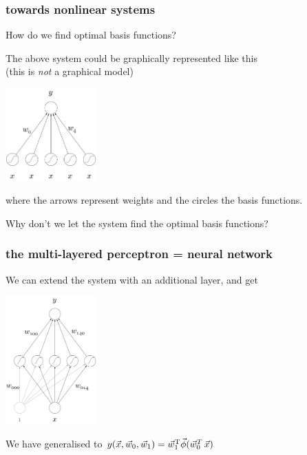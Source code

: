 \documentclass[USenglish,pdftex,compress,10pt,svgnamesi,handout]{beamer}
\begin{document}
\begin{frame}
\frametitle{towards nonlinear systems}
How do we find optimal basis functions?

\pause
The above system could be graphically represented like this \\(this is \textsl{not} a graphical model)

\centerline{\includegraphics[width=35mm]{linreg-pict}}

where the arrows represent weights and the circles the basis functions.  

Why don't we let the system find the optimal basis functions?
\end{frame}


\begin{frame}
\frametitle{the multi-layered perceptron = neural network}
We can extend the system with an additional layer, and get

\centerline{\includegraphics[width=35mm]{nn-pict}}


We have generalised to
$
	y(\Vec{x},\Vec{w}_0, \Vec w_1) = \Vec{w}_1^{\text{T}}\Vec{\phi}(\Vec{w}_0^T\,\Vec{x})
$
\end{frame}
\end{document}
